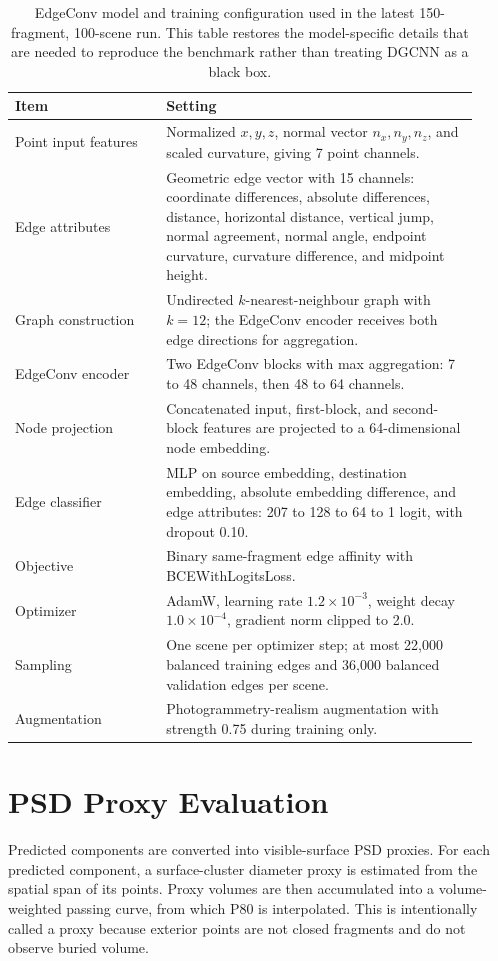 \documentclass[11pt]{article}
\begin{document}
\begin{table}[t]
\centering
\small
\caption{EdgeConv model and training configuration used in the latest 150-fragment, 100-scene run. This table restores the model-specific details that are needed to reproduce the benchmark rather than treating DGCNN as a black box.}
\label{tab:model-training}
\begin{tabular}{p{0.30\linewidth}p{0.62\linewidth}}
\toprule
Item & Setting \\
\midrule
Point input features & Normalized $x,y,z$, normal vector $n_x,n_y,n_z$, and scaled curvature, giving 7 point channels. \\
Edge attributes & Geometric edge vector with 15 channels: coordinate differences, absolute differences, distance, horizontal distance, vertical jump, normal agreement, normal angle, endpoint curvature, curvature difference, and midpoint height. \\
Graph construction & Undirected $k$-nearest-neighbour graph with $k=12$; the EdgeConv encoder receives both edge directions for aggregation. \\
EdgeConv encoder & Two EdgeConv blocks with max aggregation: 7 to 48 channels, then 48 to 64 channels. \\
Node projection & Concatenated input, first-block, and second-block features are projected to a 64-dimensional node embedding. \\
Edge classifier & MLP on source embedding, destination embedding, absolute embedding difference, and edge attributes: 207 to 128 to 64 to 1 logit, with dropout 0.10. \\
Objective & Binary same-fragment edge affinity with BCEWithLogitsLoss. \\
Optimizer & AdamW, learning rate $1.2\times 10^{-3}$, weight decay $1.0\times 10^{-4}$, gradient norm clipped to 2.0. \\
Sampling & One scene per optimizer step; at most 22,000 balanced training edges and 36,000 balanced validation edges per scene. \\
Augmentation & Photogrammetry-realism augmentation with strength 0.75 during training only. \\
\bottomrule
\end{tabular}
\end{table}

\section{PSD Proxy Evaluation}
Predicted components are converted into visible-surface PSD proxies. For each predicted component, a surface-cluster diameter proxy is estimated from the spatial span of its points. Proxy volumes are then accumulated into a volume-weighted passing curve, from which P80 is interpolated. This is intentionally called a proxy because exterior points are not closed fragments and do not observe buried volume.
\end{document}
